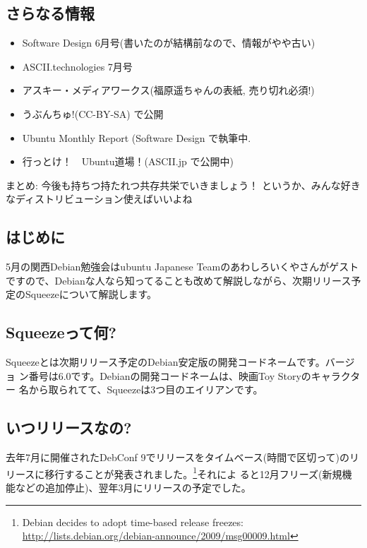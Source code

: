 \documentclass[mingoth,a4paper]{jsarticle}
\begin{document}
  \subsection{さらなる情報}
  \begin{itemize}
        \item Software Design 6月号(書いたのが結構前なので、情報がやや古い)
        \item ASCII.technologies 7月号
        \item アスキー・メディアワークス(福原遥ちゃんの表紙, 売り切れ必須!)
        \item うぶんちゅ!(CC-BY-SA) で公開
        \item Ubuntu Monthly Report (Software Design で執筆中. 
        \item 行っとけ！　Ubuntu道場！(ASCII.jp で公開中)
  \end{itemize}
  

まとめ: 
今後も持ちつ持たれつ共存共栄でいきましょう！
というか、みんな好きなディストリビューション使えばいいよね



\subsection{はじめに}
5月の関西Debian勉強会はubuntu Japanese Teamのあわしろいくやさんがゲスト
ですので、Debianな人なら知ってることも改めて解説しながら、次期リリース予
定のSqueezeについて解説します。

\subsection{Squeezeって何?}
Squeezeとは次期リリース予定のDebian安定版の開発コードネームです。バージョ
ン番号は6.0です。Debianの開発コードネームは、映画Toy Storyのキャラクター
名から取られてて、Squeezeは3つ目のエイリアンです。

\subsection{いつリリースなの?}

去年7月に開催されたDebConf 9でリリースをタイムベース(時間で区切って)のリ
リースに移行することが発表されました。\footnote{Debian decides to adopt
time-based release freezes:
\url{http://lists.debian.org/debian-announce/2009/msg00009.html}}それによ
ると12月フリーズ(新規機能などの追加停止)、翌年3月にリリースの予定でした。
\end{document}
